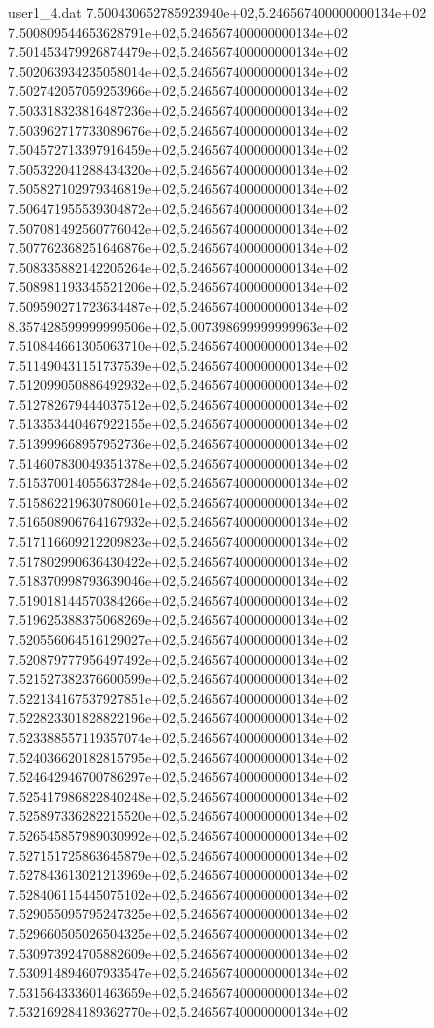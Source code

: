\begin{filecontents}{user1_4.dat}
7.500430652785923940e+02,5.246567400000000134e+02
7.500809544653628791e+02,5.246567400000000134e+02
7.501453479926874479e+02,5.246567400000000134e+02
7.502063934235058014e+02,5.246567400000000134e+02
7.502742057059253966e+02,5.246567400000000134e+02
7.503318323816487236e+02,5.246567400000000134e+02
7.503962717733089676e+02,5.246567400000000134e+02
7.504572713397916459e+02,5.246567400000000134e+02
7.505322041288434320e+02,5.246567400000000134e+02
7.505827102979346819e+02,5.246567400000000134e+02
7.506471955539304872e+02,5.246567400000000134e+02
7.507081492560776042e+02,5.246567400000000134e+02
7.507762368251646876e+02,5.246567400000000134e+02
7.508335882142205264e+02,5.246567400000000134e+02
7.508981193345521206e+02,5.246567400000000134e+02
7.509590271723634487e+02,5.246567400000000134e+02
8.357428599999999506e+02,5.007398699999999963e+02
7.510844661305063710e+02,5.246567400000000134e+02
7.511490431151737539e+02,5.246567400000000134e+02
7.512099050886492932e+02,5.246567400000000134e+02
7.512782679444037512e+02,5.246567400000000134e+02
7.513353440467922155e+02,5.246567400000000134e+02
7.513999668957952736e+02,5.246567400000000134e+02
7.514607830049351378e+02,5.246567400000000134e+02
7.515370014055637284e+02,5.246567400000000134e+02
7.515862219630780601e+02,5.246567400000000134e+02
7.516508906764167932e+02,5.246567400000000134e+02
7.517116609212209823e+02,5.246567400000000134e+02
7.517802990636430422e+02,5.246567400000000134e+02
7.518370998793639046e+02,5.246567400000000134e+02
7.519018144570384266e+02,5.246567400000000134e+02
7.519625388375068269e+02,5.246567400000000134e+02
7.520556064516129027e+02,5.246567400000000134e+02
7.520879777956497492e+02,5.246567400000000134e+02
7.521527382376600599e+02,5.246567400000000134e+02
7.522134167537927851e+02,5.246567400000000134e+02
7.522823301828822196e+02,5.246567400000000134e+02
7.523388557119357074e+02,5.246567400000000134e+02
7.524036620182815795e+02,5.246567400000000134e+02
7.524642946700786297e+02,5.246567400000000134e+02
7.525417986822840248e+02,5.246567400000000134e+02
7.525897336282215520e+02,5.246567400000000134e+02
7.526545857989030992e+02,5.246567400000000134e+02
7.527151725863645879e+02,5.246567400000000134e+02
7.527843613021213969e+02,5.246567400000000134e+02
7.528406115445075102e+02,5.246567400000000134e+02
7.529055095795247325e+02,5.246567400000000134e+02
7.529660505026504325e+02,5.246567400000000134e+02
7.530973924705882609e+02,5.246567400000000134e+02
7.530914894607933547e+02,5.246567400000000134e+02
7.531564333601463659e+02,5.246567400000000134e+02
7.532169284189362770e+02,5.246567400000000134e+02

\end{filecontents}
